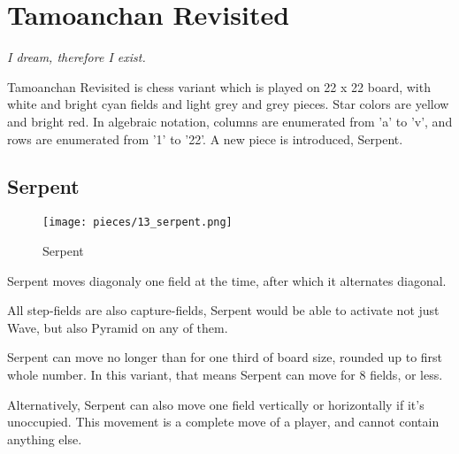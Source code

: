 

\chapter*{Tamoanchan Revisited}

\begin{flushright}
\parbox{0.6\textwidth}{
\emph{I dream, therefore I exist. \\
 } }
\end{flushright}

\noindent
Tamoanchan Revisited is chess variant which is played on 22 x 22 board,
with white and bright cyan fields and light grey and grey pieces.
Star colors are yellow and bright red. In algebraic notation, columns
are enumerated from 'a' to 'v', and rows are enumerated from '1' to '22'.
A new piece is introduced, Serpent.

\clearpage %

\section*{Serpent}

\noindent
\begin{wrapfigure}[11]{l}{0.4\textwidth}
\centering
\texttt{[image: pieces/13\_serpent.png]}
\caption{Serpent}
\label{fig:13_serpent}
\end{wrapfigure}
Serpent moves diagonaly one field at the time, after which it alternates
diagonal.

All step-fields are also capture-fields, Serpent would be able to activate
not just Wave, but also Pyramid on any of them.

Serpent can move no longer than for one third of board size, rounded up to
first whole number. In this variant, that means Serpent can move for 8
fields, or less.

Alternatively, Serpent can also move one field vertically or horizontally
if it's unoccupied. This movement is a complete move of a player, and cannot
contain anything else.


